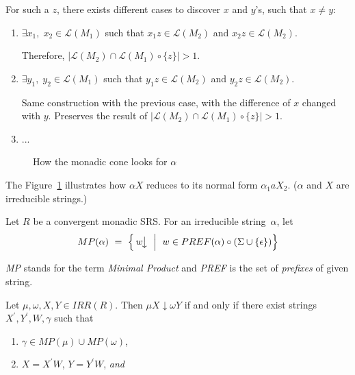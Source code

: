 \documentclass{lmcs} %
\theoremstyle{plain}\newtheorem{satz}[thm]{Satz} %
\newcommand{\ignore}[1]{}
\begin{document}
\begin{appendices}
{        For such a $z$, there exists different cases to discover $x$ and $y$'s, such that $x \neq y$:
        \begin{enumerate}[label=\roman*.]
        \item $\exists x_1,\; x_2 \in \mathcal{L}( M_1^{} )$ such that $x_1 z \in \mathcal{L}( M_2^{} )$ and $x_2 z \in \mathcal{L}( M_2^{} )$. 
        
        Therefore, $| \mathcal{L}( M_2^{} ) \cap \mathcal{L}( M_1^{} ) \circ \{ z\} | > 1$. \ignore{cdot}
        \item $\exists y_1,\; y_2 \in \mathcal{L}( M_1^{} )$ such that $y_1 z \in \mathcal{L}( M_2^{} )$ and $y_2 z \in \mathcal{L}( M_2^{} )$. 
        
        Same construction with the previous case, with the difference of $x$ changed with $y$. Preserves the result of $| \mathcal{L}( M_2^{} ) \cap \mathcal{L}( M_1^{} ) \circ \{ z\} | > 1$. 
        \item ...
        \end{enumerate}
        }

\begin{figure}
\centering
{}
\caption{How the monadic cone looks for $\alpha$}
\label{monadicCone}
\end{figure}

The Figure~\ref{monadicCone} illustrates how $\alpha X$ reduces to its normal form $\alpha^{}_1 a X_2$. ($\alpha$
and $X$ are irreducible strings.)

Let $R$ be a convergent monadic SRS. For an irreducible string~$\alpha$, let \[ MP(\alpha) 
~ = ~ \Big\{ \, w\!\big\downarrow \; ~ \Big| ~ \; w \in PREF(\alpha) \circ (\Sigma \cup \{ \epsilon \})
      \Big\} \]

\emph{MP} stands for the term \emph{Minimal Product} and \emph{PREF}
is the set of \emph{prefixes} of given string.


\begin{lem}{\label{CEOneMappingMonadicLemma1}}
Let $\mu, \omega, X, Y \in IRR(R)$. Then $\mu X  \downarrow  \omega Y$ if and only
if there exist strings~$X^{\prime}, Y^{\prime}, W, \gamma$ such that
\begin{enumerate}

\item $\gamma \in MP(\mu) \cup MP(\omega)$,

\item $X = X^{\prime} W$, $Y = Y^{\prime} W$, \emph{and}


\end{enumerate}
\end{lem}
\end{appendices}
\end{document}
